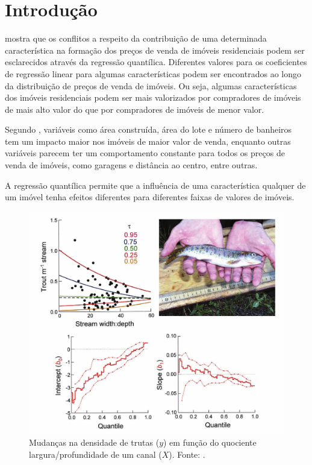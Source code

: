 \documentclass[a4paper, 12pt]{article}
\begin{document}
\hypertarget{introducao}{%
\section{Introdução}\label{introducao}}

\textcite{Zietz} mostra que os conflitos a respeito da contribuição de
uma determinada característica na formação dos preços de venda de
imóveis residenciais podem ser esclarecidos através da regressão
quantílica. Diferentes valores para os coeficientes de regressão linear
para algumas características podem ser encontrados ao longo da
distribuição de preços de venda de imóveis. Ou seja, algumas
características dos imóveis residenciais podem ser mais valorizados por
compradores de imóveis de mais alto valor do que por compradores de
imóveis de menor valor.

Segundo \textcite{Zietz}, variáveis como área construída, área do lote e
número de banheiros tem um impacto maior nos imóveis de maior valor de
venda, enquanto outras variáveis parecem ter um comportamento constante
para todos os preços de venda de imóveis, como garagens e distância ao
centro, entre outras.

A regressão quantílica permite que a influência de uma característica
qualquer de um imóvel tenha efeitos diferentes para diferentes faixas de
valores de imóveis.

\begin{figure}[H]

{\centering \includegraphics[width=1\linewidth]{images/-000} 

}

\caption{Mudanças na densidade de trutas ($y$) em função do quociente largura/profundidade de um canal ($X$). Fonte: \textcite[413]{QReco}.}\label{fig:trutas}
\end{figure}
\end{document}
